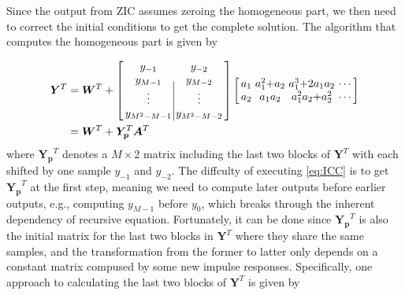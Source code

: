 Since the output from ZIC assumes zeroing the homogeneous part, we then need to correct the initial conditions to get the complete solution.
The algorithm that computes the homogeneous part is given by

\begin{equation}
    \label{eq:ICC}
    \begin{aligned}
        \bm{Y}^T &= \bm{W}^T + \left[\arraycolsep=1.6pt\def\arraystretch{1.0}
                \begin{array}{c|c}
                y_{-1} & y_{-2} \\ 
                y_{M-1} & y_{M-2} \\
                \vdots & \vdots \\
                y_{M^2-M-1} & y_{M^2-M-2}
                \end{array}\right]  
                \left[\arraycolsep=1.6pt\def\arraystretch{1.0}
                    \begin{array}{cccc}
                    a_1 & a_1^2{+}a_2 & a_1^3{+}2a_1a_2 & \cdots \\ 
                    a_2 & a_1a_2 & a_1^2a_2{+}a_2^2 & \cdots \\
                    \end{array}\right] \\
        & = \bm{W}^T + \bm{Y_p}^T  \bm{A}^T
    \end{aligned}
\end{equation}
where $\bm{Y_p}^T$ denotes a $M \times 2$ matrix including the last two blocks of $\bm{Y}^T$ 
with each shifted by one sample $y_{-1}$ and $y_{-2}$.
The diffculty of executing \eqref{eq:ICC} is to get $\bm{Y_p}^T$ at the first step, meaning we need to compute later outputs before earlier outputs, e.g.,
computing $y_{M-1}$ before $y_0$, which breaks through the inherent dependency of recursive equation.
Fortunately, it can be done since $\bm{Y_p}^T$ is also the initial matrix for the last two blocks in $\bm{Y}^T$ where they share the same 
samples, and the transformation from the former to latter only depends on a constant matrix compused by some new impulse responses.
Specifically, one approach to calculating the last two blocks of $\bm{Y}^T$ is given by

